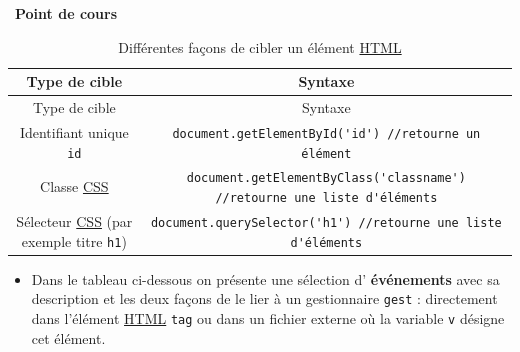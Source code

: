 \documentclass[
  11pt,
]{article}
\newcommand{\passthrough}[1]{#1}
\providecommand{\tightlist}{%
  \setlength{\itemsep}{0pt}\setlength{\parskip}{0pt}}
\newcounter{cours}
\newenvironment{cours}[1]
{\par \medskip   \addtocounter{cours}{1} \noindent  
\begin{bclogo}[arrondi =0.1,  ombre = true, barre=none, logo=\bcbook, marge=4]{~\textbf{Point de cours} \textbf{\thecours} {\itshape #1} }  \par}
{
\end{bclogo}
 \par \bigskip }
\begin{document}
\begin{cours}{}
\begin{longtable}[]{@{}cc@{}}
\caption{Différentes façons de cibler un élément
\href{https://developer.mozilla.org/fr/docs/Glossaire/HTML}{HTML}}\tabularnewline
\toprule
\begin{minipage}[b]{0.47\columnwidth}\centering
Type de cible\strut
\end{minipage} & \begin{minipage}[b]{0.47\columnwidth}\centering
Syntaxe\strut
\end{minipage}\tabularnewline
\midrule
\endfirsthead
\toprule
\begin{minipage}[b]{0.47\columnwidth}\centering
Type de cible\strut
\end{minipage} & \begin{minipage}[b]{0.47\columnwidth}\centering
Syntaxe\strut
\end{minipage}\tabularnewline
\midrule
\endhead
\begin{minipage}[t]{0.47\columnwidth}\centering
Identifiant unique \passthrough{\lstinline!id!}\strut
\end{minipage} & \begin{minipage}[t]{0.47\columnwidth}\centering
\passthrough{\lstinline!document.getElementById('id') //retourne un élément!}\strut
\end{minipage}\tabularnewline
\begin{minipage}[t]{0.47\columnwidth}\centering
Classe
\href{https://developer.mozilla.org/fr/docs/Glossaire/CSS}{CSS}\strut
\end{minipage} & \begin{minipage}[t]{0.47\columnwidth}\centering
\passthrough{\lstinline!document.getElementByClass('classname') //retourne une liste d'éléments!}\strut
\end{minipage}\tabularnewline
\begin{minipage}[t]{0.47\columnwidth}\centering
Sélecteur
\href{https://developer.mozilla.org/fr/docs/Glossaire/CSS}{CSS} (par
exemple titre \passthrough{\lstinline!h1!})\strut
\end{minipage} & \begin{minipage}[t]{0.47\columnwidth}\centering
\passthrough{\lstinline!document.querySelector('h1') //retourne une liste d'éléments!}\strut
\end{minipage}\tabularnewline
\bottomrule
\end{longtable}

\begin{itemize}
\tightlist
\item
  Dans le tableau ci-dessous on présente une sélection d'
  \textbf{événements} avec sa description et les deux façons de le lier
  à un gestionnaire \passthrough{\lstinline!gest!} : directement dans
  l'élément
  \href{https://developer.mozilla.org/fr/docs/Glossaire/HTML}{HTML}
  \passthrough{\lstinline!tag!} ou dans un fichier externe où la
  variable \passthrough{\lstinline!v!} désigne cet élément.
\end{itemize}


\end{cours}
\end{document}
